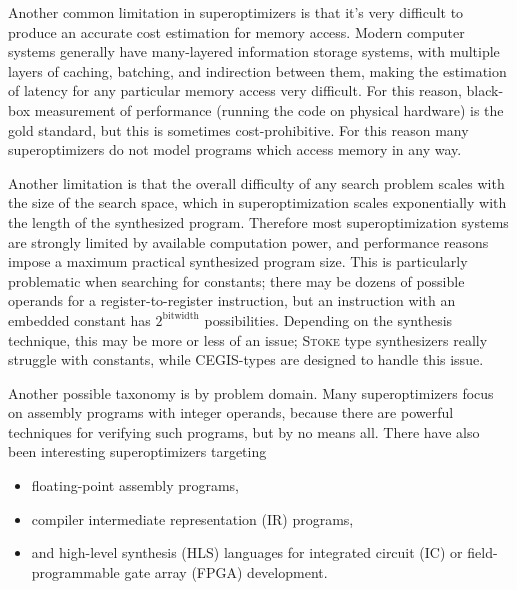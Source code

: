 \documentclass[12pt,twoside]{reedthesis}
\begin{document}
    Another common limitation in superoptimizers is that it's very difficult to produce an accurate cost estimation for memory access.
    Modern computer systems generally have many-layered information storage systems, with multiple layers of caching, batching, and indirection between them, making the estimation of latency for any particular memory access very difficult.
    For this reason, black-box measurement of performance (running the code on physical hardware) is the gold standard, but this is sometimes cost-prohibitive.
    For this reason many superoptimizers do not model programs which access memory in any way.
    
    Another limitation is that the overall difficulty of any search problem scales with the size of the search space, which in superoptimization scales exponentially with the length of the synthesized program.
    Therefore most superoptimization systems are strongly limited by available computation power, and performance reasons impose a maximum practical synthesized program size.
    This is particularly problematic when searching for constants; there may be dozens of possible operands for a register-to-register instruction, but an instruction with an embedded constant has $2^\text{bitwidth}$ possibilities.
    Depending on the synthesis technique, this may be more or less of an issue; 
    \textsc{Stoke} type synthesizers really struggle with constants, while CEGIS-types are designed to handle this issue.
    
    Another possible taxonomy is by problem domain.
    Many superoptimizers focus on assembly programs with integer operands, because there are powerful techniques for verifying such programs, but by no means all.
    There have also been interesting superoptimizers targeting 
    \begin{itemize}
        \item floating-point assembly programs, 
        \item compiler intermediate representation (IR) programs, 
        \item and high-level synthesis (HLS) languages for integrated circuit (IC) or field-programmable gate array (FPGA) development.
    \end{itemize}
    
\end{document}
